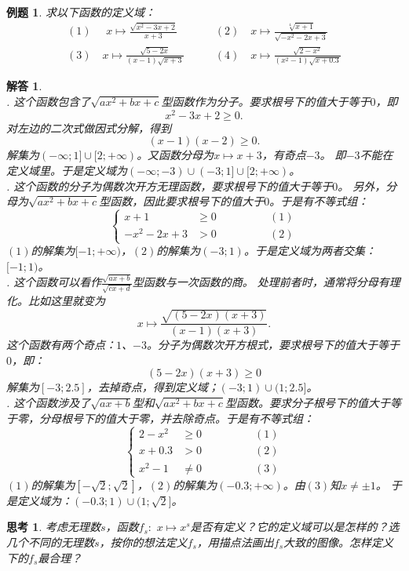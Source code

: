 \documentclass[12pt,UTF8]{ctexbook}
\newtheorem{et}{例题}[section]
\newtheorem{sk}{思考}[section]
\newtheorem*{so}{解答}
\begin{document}
\begin{et}
    求以下函数的定义域：\\
    \begin{align*}
        (1) \,\,\quad x\mapsto \frac{\sqrt{x^2 - 3x + 2}}{x + 3} \quad & \quad (2) \quad x\mapsto \frac{\sqrt[4]{x + 1}}{\sqrt{- x^2 - 2x + 3}} \\
        (3) \quad x\mapsto \frac{\sqrt{5 - 2x}}{(x - 1)\sqrt{x + 3}} \quad & \quad (4)\quad x\mapsto \frac{\sqrt{2 - x^2}}{(x^2 - 1)\sqrt{x + 0.3}}  
    \end{align*}
\end{et}
\begin{so}
    \mbox{}\\
    . 这个函数包含了$\sqrt{ax^2 + bx + c}$型函数作为分子。要求根号下的值大于等于$0$，即
    $$ x^2 - 3x + 2 \geqslant 0.$$
    对左边的二次式做因式分解，得到
    $$ (x - 1)(x - 2) \geqslant 0.$$
    解集为$(-\infty; 1]\cup[2; +\infty)$。又函数分母为$x\mapsto x + 3$，有奇点$-3$。
    即$-3$不能在定义域里。于是定义域为$(-\infty; -3)\cup(-3; 1]\cup[2;  +\infty)$。\\
    . 这个函数的分子为偶数次开方无理函数，要求根号下的值大于等于$0$。
    另外，分母为$\sqrt{ax^2 + bx + c}$型函数，因此要求根号下的值大于$0$。于是有不等式组：
    $$\left\{\begin{array}{ccr}
        x + 1 &\geqslant 0 & \quad\quad\quad\quad (1) \\
        - x^2 - 2x + 3 &> 0  & \quad\quad\quad\quad (2)
    \end{array}\right.$$
    $(1)$的解集为$[-1; +\infty)$，$(2)$的解集为$(-3;  1)$。于是定义域为两者交集：$[-1;  1)$。\\
    . 这个函数可以看作$\frac{\sqrt{ax + b}}{\sqrt{cx + d}}$型函数与一次函数的商。
    处理前者时，通常将分母有理化。比如这里就变为
    $$ x \mapsto \frac{\sqrt{(5 - 2x)(x + 3)}}{(x - 1)(x + 3)}. $$
    这个函数有两个奇点：$1$、$-3$。分子为偶数次开方根式，要求根号下的值大于等于$0$，即：
    $$ (5 - 2x)(x + 3) \geqslant 0$$
    解集为$[-3; 2.5]$，去掉奇点，得到定义域；$(-3; 1)\cup(1; 2.5]$。\\
    . 这个函数涉及了$\sqrt{ax + b}$型和$\sqrt{ax^2 + bx + c}$型函数。要求分子根号下的值大于等于零，分母根号下的值大于零，并去除奇点。于是有不等式组：
    $$\left\{\begin{array}{ccr}
        2 - x^2 &\geqslant 0 & \quad\quad\quad\quad (1) \\
        x + 0.3 &> 0  & \quad\quad\quad\quad (2) \\
        x^2 - 1 &\neq 0 & \quad\quad\quad\quad (3) 
    \end{array}\right.$$
    $(1)$的解集为$[-\sqrt{2};\sqrt{2}]$，$(2)$的解集为$(-0.3; +\infty)$。由$(3)$知$x\neq \pm 1$。
    于是定义域为：$(-0.3; 1)\cup(1; \sqrt{2}]$。
\end{so}
\begin{sk}
    考虑无理数$s$，函数$f_s: \,\, x\mapsto x^s$是否有定义？它的定义域可以是怎样的？选几个不同的无理数$s$，按你的想法定义$f_s$，用描点法画出$f_s$大致的图像。怎样定义下的$f_s$最合理？
\end{sk}
\end{document}
